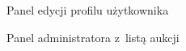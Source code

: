 \begin{figure}[h]
\centering
{}
\caption{Panel edycji profilu użytkownika}
\label{screen07}
\end{figure}

\begin{figure}[h]
\centering
{}
\caption{Panel administratora z~listą aukcji}
\label{screen08}
\end{figure}
